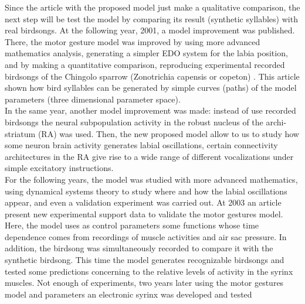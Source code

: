 \vspace{10pt}
Since the article with the proposed model just make a qualitative comparison, the next step will be test the model by comparing its result (synthetic syllables) with real birdsongs. At the following year, 2001, a model improvement was published. There, the motor gesture model was improved by using more advanced mathematics analysis, generating a simpler EDO system for the labia position, and by making a quantitative comparison, reproducing experimental recorded birdsongs of the Chingolo sparrow  (Zonotrichia capensis or copeton) \cite{Neuromuscular}. This article shown how bird syllables can be generated by simple curves (paths) of the model parameters (three dimensional parameter space). \\

In the same year, another model improvement was made: instead of use recorded birdsongs the neural subpopulation activity in the robust nucleus of the archi-striatum (RA) was used. Then, the new proposed model allow to us to study how some neuron brain activity generates labial oscillations,  certain connectivity architectures in the RA give rise to a wide range of different vocalizations under simple excitatory instructions. \cite{diversity}\\

For the following years, the model was studied with more advanced mathematics, using dynamical systems theory to study where and how the labial oscillations appear, and even a validation experiment was carried out. At 2003 an article present new experimental support data to validate the motor gestures model. Here, the model uses as control parameters some functions whose time dependence comes from recordings of muscle activities and air sac pressure. In addition, the birdsong was simultaneously recorded to compare it with the synthetic birdsong. This time the model generates recognizable birdsongs and tested some predictions concerning to the relative levels of activity in the syrinx muscles. \cite{experimental_support} Not enough of experiments, two years later using the motor gestures model and parameters an electronic syrinx was developed and tested \cite{electronic_syrinx}

